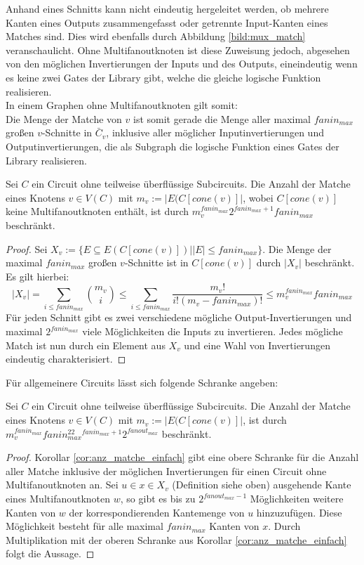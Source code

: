 \documentclass[11pt, a4paper, german]{article}
\begin{document}
Anhand eines Schnitts kann nicht eindeutig hergeleitet werden, ob mehrere Kanten eines Outputs zusammengefasst oder getrennte Input-Kanten eines Matches sind. Dies wird ebenfalls durch Abbildung \ref{bild:mux_match} veranschaulicht. Ohne Multifanoutknoten ist diese Zuweisung jedoch, abgesehen von den möglichen Invertierungen der Inputs und des Outputs, eineindeutig wenn es keine zwei Gates der Library gibt, welche die gleiche  logische Funktion realisieren.\\
In einem Graphen ohne Multifanoutknoten gilt somit: \\
Die Menge der Matche von $v$ ist somit gerade die Menge aller maximal $fanin_{max}$ großen $v$-Schnitte in $\bar{C}_v$, inklusive aller möglicher Inputinvertierungen und Outputinvertierungen, die als Subgraph die logische Funktion eines Gates der Library realisieren.
\begin{cor}\label{cor:anz_matche_einfach}
Sei $C$ ein Circuit ohne teilweise überflüssige Subcircuits. Die Anzahl der Matche eines Knotens $v\in V(C)$ mit $m_v := |E(C[cone(v)]|$, wobei $C[cone(v)]$ keine Multifanoutknoten enthält, ist durch $m_v^{fanin_{max}} 2^{fanin_{max}+1} fanin_{max}$ beschränkt.
\end{cor}
\begin{proof}
Sei  $X_v:= \{ E \subseteq E(C[cone(v)]) | |E|\leq fanin_{max}  \}$. Die Menge der maximal $fanin_{max}$ großen $v$-Schnitte ist in $C[cone(v)]$ durch $ |X_v|$ beschränkt. Es gilt hierbei:
\[ |X_v| = \sum\limits_{i \leq fanin_{max}} \binom{m_v}{i} \leq  \sum\limits_{i \leq fanin_{max}}\frac{m_v!}{i!(m_v-fanin_{max})!} \leq m_v^{fanin_{max}} fanin_{max} \]
Für jeden Schnitt gibt es zwei verschiedene mögliche Output-Invertierungen und maximal  $2^{fanin_{max}}$ viele Möglichkeiten die Inputs zu invertieren. Jedes mögliche Match ist nun durch ein Element aus $X_v$ und eine Wahl von Invertierungen eindeutig charakterisiert.
\end{proof}
Für allgemeinere Circuits lässt sich folgende Schranke angeben: 
\begin{cor}\label{cor:anzahl_matche_bel}
Sei $C$ ein Circuit ohne teilweise überflüssige Subcircuits. Die Anzahl der Matche eines Knotens $v\in V(C)$ mit $m_v := |E(C[cone(v)]|$, ist durch \\ $m_v^{fanin_{max}} fanin_{max}^22^{fanin_{max}+1}2^{fanout_{max}}$ beschränkt.
\end{cor}
\begin{proof}
Korollar \ref{cor:anz_matche_einfach} gibt eine obere Schranke für die Anzahl aller Matche inklusive der möglichen Invertierungen für einen Circuit ohne Multifanoutknoten an. Sei $u \in x \in X_v$ (Definition siehe oben) ausgehende Kante eines Multifanoutknoten $w$, so gibt es bis zu $2^{fanout_{max}-1}$ Möglichkeiten weitere Kanten von $w$ der korrespondierenden Kantemenge von $u$ hinzuzufügen.  Diese Möglichkeit besteht für alle maximal $fanin_{max}$ Kanten von $x$. Durch Multiplikation mit der oberen Schranke aus Korollar \ref{cor:anz_matche_einfach} folgt die Aussage.
\end{proof}
\end{document}
